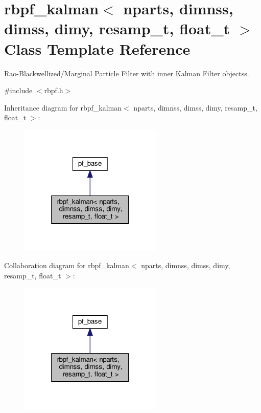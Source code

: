 \hypertarget{classrbpf__kalman}{}\section{rbpf\+\_\+kalman$<$ nparts, dimnss, dimss, dimy, resamp\+\_\+t, float\+\_\+t $>$ Class Template Reference}
\label{classrbpf__kalman}


Rao-\/\+Blackwellized/\+Marginal Particle Filter with inner Kalman Filter objectss.  




{\ttfamily \#include $<$rbpf.\+h$>$}



Inheritance diagram for rbpf\+\_\+kalman$<$ nparts, dimnss, dimss, dimy, resamp\+\_\+t, float\+\_\+t $>$\+:
\nopagebreak
\begin{figure}[H]
\begin{center}
\leavevmode
\includegraphics[width=193pt]{classrbpf__kalman__inherit__graph}
\end{center}
\end{figure}


Collaboration diagram for rbpf\+\_\+kalman$<$ nparts, dimnss, dimss, dimy, resamp\+\_\+t, float\+\_\+t $>$\+:
\nopagebreak
\begin{figure}[H]
\begin{center}
\leavevmode
\includegraphics[width=193pt]{classrbpf__kalman__coll__graph}
\end{center}
\end{figure}
